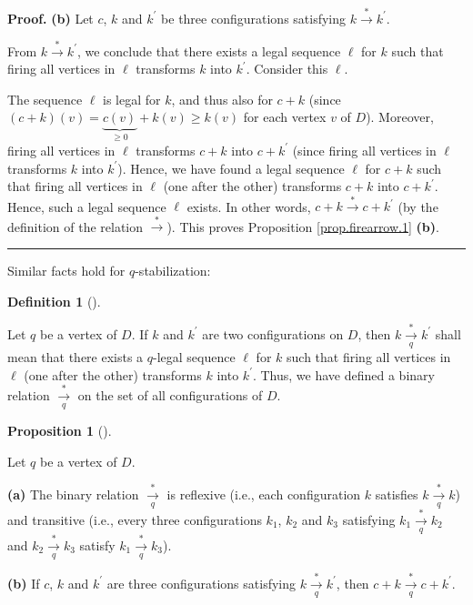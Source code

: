 \documentclass[numbers=enddot,12pt,final,onecolumn,notitlepage]{scrartcl}%
\theoremstyle{definition}
\newtheorem{prop}[theo]{Proposition}
\newenvironment{proposition}[1][]
{\begin{prop}[#1]\begin{leftbar}}
{\end{leftbar}\end{prop}}
\newtheorem{defi}[theo]{Definition}
\newenvironment{definition}[1][]
{\begin{defi}[#1]\begin{leftbar}}
{\end{leftbar}\end{defi}}
\newenvironment{proof}[1][Proof]{\noindent\textbf{#1.} }{\ \rule{0.5em}{0.5em}}
\begin{document}
\begin{proof}
\textbf{(b)} Let $c$, $k$ and $k^{\prime}$ be three configurations satisfying
$k\overset{\ast}{\rightarrow}k^{\prime}$.

From $k\overset{\ast}{\rightarrow}k^{\prime}$, we conclude that there exists a
legal sequence $\ell$ for $k$ such that firing all vertices in $\ell$
transforms $k$ into $k^{\prime}$. Consider this $\ell$.

The sequence $\ell$ is legal for $k$, and thus also for $c+k$ (since $\left(
c+k\right)  \left(  v\right)  =\underbrace{c\left(  v\right)  }_{\geq
0}+k\left(  v\right)  \geq k\left(  v\right)  $ for each vertex $v$ of $D$).
Moreover, firing all vertices in $\ell$ transforms $c+k$ into $c+k^{\prime}$
(since firing all vertices in $\ell$ transforms $k$ into $k^{\prime}$). Hence,
we have found a legal sequence $\ell$ for $c+k$ such that firing all vertices
in $\ell$ (one after the other) transforms $c+k$ into $c+k^{\prime}$. Hence,
such a legal sequence $\ell$ exists. In other words, $c+k\overset{\ast
}{\rightarrow}c+k^{\prime}$ (by the definition of the relation $\overset{\ast
}{\rightarrow}$). This proves Proposition \ref{prop.firearrow.1} \textbf{(b)}.
\end{proof}

Similar facts hold for $q$-stabilization:

\begin{definition}
\label{def.firearrow-q}Let $q$ be a vertex of $D$. If $k$ and $k^{\prime}$ are
two configurations on $D$, then $k\underset{q}{\overset{\ast}{\rightarrow}%
}k^{\prime}$ shall mean that there exists a $q$-legal sequence $\ell$ for $k$
such that firing all vertices in $\ell$ (one after the other) transforms $k$
into $k^{\prime}$. Thus, we have defined a binary relation
$\underset{q}{\overset{\ast}{\rightarrow}}$ on the set of all configurations
of $D$.
\end{definition}

\begin{proposition}
\label{prop.firearrow-q.1}Let $q$ be a vertex of $D$.

\textbf{(a)} The binary relation $\underset{q}{\overset{\ast}{\rightarrow}}$
is reflexive (i.e., each configuration $k$ satisfies
$k\underset{q}{\overset{\ast}{\rightarrow}}k$) and transitive (i.e., every
three configurations $k_{1}$, $k_{2}$ and $k_{3}$ satisfying $k_{1}%
\underset{q}{\overset{\ast}{\rightarrow}}k_{2}$ and $k_{2}%
\underset{q}{\overset{\ast}{\rightarrow}}k_{3}$ satisfy $k_{1}%
\underset{q}{\overset{\ast}{\rightarrow}}k_{3}$).

\textbf{(b)} If $c$, $k$ and $k^{\prime}$ are three configurations satisfying
$k\underset{q}{\overset{\ast}{\rightarrow}}k^{\prime}$, then
$c+k\underset{q}{\overset{\ast}{\rightarrow}}c+k^{\prime}$.
\end{proposition}
\end{document}
